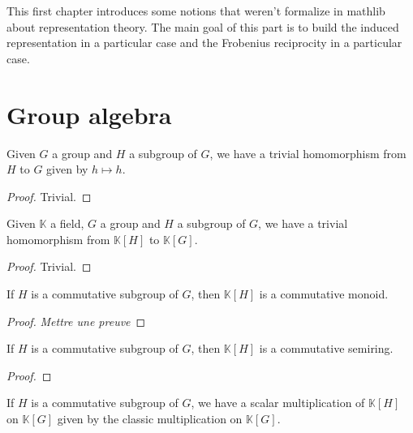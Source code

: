 This first chapter introduces some notions that weren't formalize in
mathlib about representation theory. The main goal of this part is to build
the induced representation in a particular case and the Frobenius reciprocity
in a particular case.

\section{Group algebra}

\begin{definition}
    \label{def:trivialHG}
    \uses{}
    \leanok
    Given $G$ a group and $H$ a subgroup of $G$, we have a trivial homomorphism from $H$
    to $G$ given by $h\mapsto h$.
    \begin{proof}
        \leanok
        Trivial.
    \end{proof}
\end{definition}

\begin{definition}
    \label{def:trivialkHkG}
    \uses{}
    \leanok
    Given $\mathbb{K}$ a field, $G$ a group and $H$ a subgroup of $G$, 
    we have a trivial homomorphism from $\mathbb{K}[H]$ to $\mathbb{K}[G]$.
    \begin{proof}
        \leanok
        Trivial.
    \end{proof}
\end{definition}

\begin{proposition}
    \label{prop:KHcomm}
    \uses{}
    \leanok 
    If $H$ is a commutative subgroup of $G$, then $\mathbb{K}[H]$ is a 
    commutative monoid.
\end{proposition}
\begin{proof}
    \leanok
    \textit{Mettre une preuve}
\end{proof}

\begin{proposition}
    \label{prop:KHcommsemiring}
    \uses{}
    \leanok
    If $H$ is a commutative subgroup of $G$, then $\mathbb{K}[H]$ is a 
    commutative semiring.
\end{proposition}
\begin{proof}
    \leanok
\end{proof}

\begin{definition}
    \label{prop:KHcommsemiring}
    \leanok
    If $H$ is a commutative subgroup of $G$, we have a scalar multiplication
    of $\mathbb{K}[H]$ on $\mathbb{K}[G]$ given by the classic multiplication
    on $\mathbb{K}[G]$.
\end{definition}

